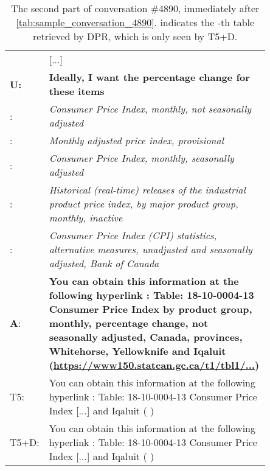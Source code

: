 \documentclass[11pt]{article}
\begin{document}
\begin{table*}[h]
    \small
    \centering
    \begin{tabular}{l p{0.85\linewidth}}
        \toprule
         & [...]
        \\
        \textbf{U:} & \textbf{Ideally, I want the percentage change for these items}
        \\
        : & \textit{Consumer Price Index, monthly, not seasonally adjusted }
        \\
        : & \textit{Monthly adjusted price index, provisional}
        \\
        : & \textit{Consumer Price Index, monthly, seasonally adjusted}
        \\
        : & \textit{Historical (real-time) releases of the industrial product price index, by major product group, monthly, inactive}
        \\
        : & \textit{Consumer Price Index (CPI) statistics, alternative measures, unadjusted and seasonally adjusted, Bank of Canada}
        \\
        \midrule
        \textbf{A}: & \textbf{You can obtain this information at the following hyperlink : Table: 18-10-0004-13 Consumer Price Index by product group, monthly, percentage change, not seasonally adjusted, Canada, provinces, Whitehorse, Yellowknife and Iqaluit (\href{https://www150.statcan.gc.ca/t1/tbl1/en/tv.action?pid=1810000413}{https://www150.statcan.gc.ca/t1/tbl1/...})}
        \\
        T5: & You can obtain this information at the following hyperlink : Table: 18-10-0004-13 Consumer Price Index [...] and Iqaluit ( )
        \\
        T5+D: & You can obtain this information at the following hyperlink : Table: 18-10-0004-13 Consumer Price Index [...] and Iqaluit ( )
        \\
        \bottomrule
    \end{tabular}
    \caption{The second part of conversation \#4890, immediately after \autoref{tab:sample_conversation_4890}.  indicates the -th table retrieved by DPR, which is only seen by T5+D.}
    \label{tab:sample_conversation_4890_part_2}
\end{table*}
\end{document}
